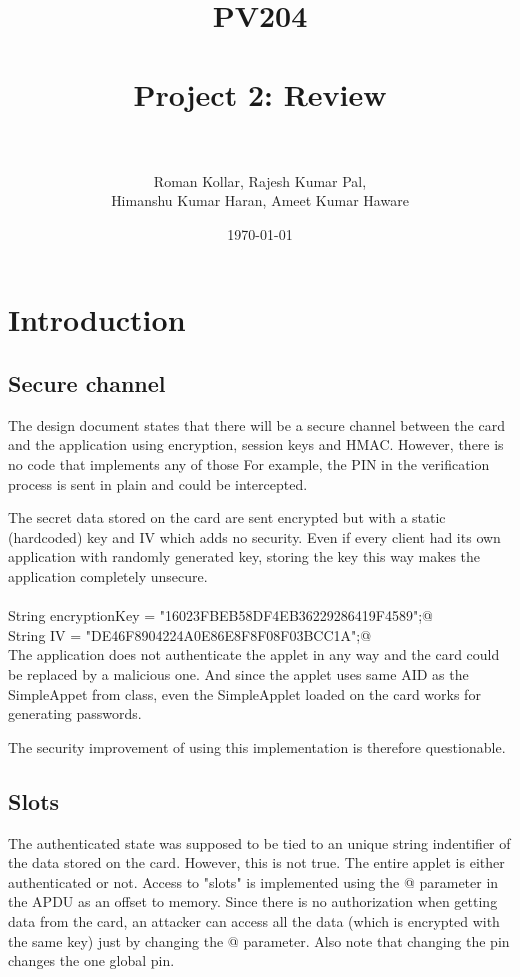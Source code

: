 \documentclass[paper=a4, fontsize=12pt]{scrartcl}
\title{
\normalfont \normalsize
\textsc{PV204} \\ [25pt]
\horrule{0.5pt} \\[0.4cm]
\huge Project 2: Review  \\
\horrule{0.5pt} \\[0.5cm]
}
\author{Roman Kollar, Rajesh Kumar Pal,\\Himanshu Kumar Haran, Ameet Kumar Haware}
\date{\normalsize\today}
\begin{document}
\maketitle

\section{Introduction}
\subsection{Secure channel}
The design document states that there will be a secure channel between the card and the application using encryption, session keys and HMAC.
However, there is no code that implements any of those
For example, the PIN in the verification process is sent in plain and could be intercepted.

The secret data stored on the card are sent encrypted but with a static (hardcoded) key and IV which adds no security.
Even if every client had its own application with randomly generated key, storing the key this way makes the application completely unsecure.\\
\\
\verb@          String encryptionKey = "16023FBEB58DF4EB36229286419F4589";@\\
\verb@          String IV = "DE46F8904224A0E86E8F8F08F03BCC1A";@
\\

The application does not authenticate the applet in any way and the card could be replaced by a malicious one.
And since the applet uses same AID as the SimpleAppet from class, even the SimpleApplet loaded on the card works for generating passwords.

The security improvement of using this implementation is therefore questionable.

\subsection{Slots}
The authenticated state was supposed to be tied to an unique string indentifier of the data stored on the card.
However, this is not true.
The entire applet is either authenticated or not.
Access to "slots" is implemented using the @ parameter in the APDU as an offset to memory.
Since there is no authorization when getting data from the card, an attacker can access all the data (which is encrypted with the same key) just by changing the @ parameter.
Also note that changing the pin changes the one global pin.
\end{document}
